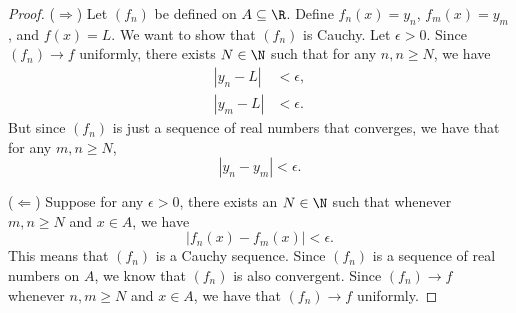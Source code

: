 \begin{proof}
    (\( \Rightarrow \)) Let \( (f_n)  \) be defined on \( A \subseteq \R   \). Define \( f_n(x) = y_n  \), \( f_m(x) = y_m  \), and \( f(x) = L  \). We want to show that \( (f_n)  \) is Cauchy. Let \( \epsilon > 0  \). Since \( (f_n) \to f  \) uniformly, there exists \( N \in \N  \) such that for any \( n,n \geq N  \), we have 
\begin{align*}
    |y_n - L   | &< \epsilon,  \\
    | y_m - L  | &< \epsilon.
\end{align*}
But  since \( (f_n)  \) is just a sequence of real numbers that converges, we have that for any \( m,n \geq N  \), 
\[ | y_n - y_m  | < \epsilon. \]

(\( \Leftarrow \)) Suppose for any \( \epsilon > 0  \), there exists an \( N \in \N  \) such that whenever \( m,n \geq N  \) and \( x \in A \), we have 
\[  | f_n(x) - f_m(x)  | < \epsilon. \]
This means that \( (f_n)  \) is a Cauchy sequence. Since \( (f_n) \) is a sequence of real numbers on \( A  \), we know that \( (f_n)  \) is also convergent. Since \( (f_n) \to f  \) whenever \( n,m \geq N  \) and \( x \in A  \), we have that \( (f_n) \to f  \) uniformly.
\end{proof}


